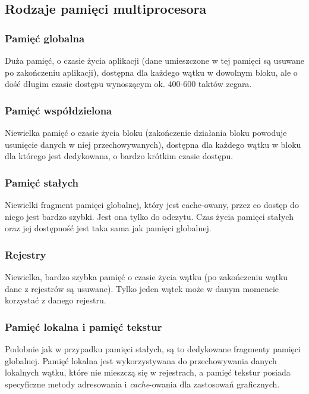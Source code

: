 \subsection{Rodzaje pamięci multiprocesora}
	\subsubsection{Pamięć globalna}
		Duża pamięć, o czasie życia aplikacji (dane umieszczone w tej pamięci są usuwane po zakończeniu aplikacji), dostępna dla każdego wątku w dowolnym bloku, ale o dość długim czasie dostępu wynoszącym ok. 400-600 taktów zegara.
	\subsubsection{Pamięć współdzielona}
		Niewielka pamięć o czasie życia bloku (zakończenie działania bloku powoduje usunięcie danych w niej przechowywanych), dostępna dla każdego wątku w bloku dla którego jest dedykowana, o bardzo krótkim czasie dostępu.
	\subsubsection{Pamięć stałych}
		Niewielki fragment pamięci globalnej, który jest cache-owany, przez co dostęp do niego jest bardzo szybki. Jest ona tylko do odczytu. Czas życia pamięci stałych oraz jej dostępność jest taka sama jak pamięci globalnej.
	\subsubsection{Rejestry}
		Niewielka, bardzo szybka pamięć o czasie życia wątku (po zakończeniu wątku dane z rejestrów są usuwane). Tylko jeden wątek może w danym momencie korzystać z danego rejestru.
	\subsubsection{Pamięć lokalna i pamięć tekstur}
		Podobnie jak w przypadku pamięci stałych, są to dedykowane fragmenty pamięci globalnej. Pamięć lokalna jest wykorzystywana do przechowywania danych lokalnych wątku, które nie mieszczą się w rejestrach, a pamięć tekstur posiada specyficzne metody adresowania i \textit{cache}-owania dla zastosowań graficznych.
\vfill
